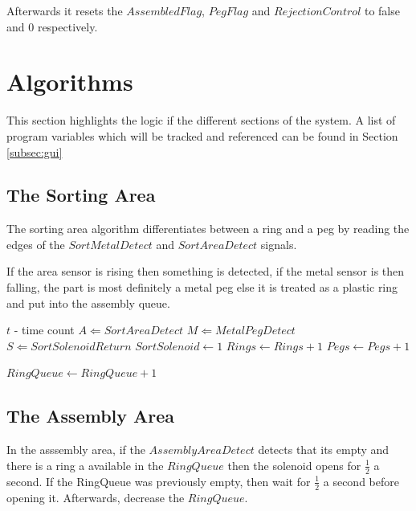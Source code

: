 \documentclass[12pt]{article}
\makeatletter
\newcommand*{\currentname}{\@currentlabelname}
\makeatother
\begin{document}
    Afterwards it resets the $AssembledFlag$, $PegFlag$ and $RejectionControl$ to false and 0
    respectively.


\section{Algorithms}
This section highlights the logic if the different sections of the system.
A list of program variables which will be tracked and referenced can be found in 
Section \ref{subsec:gui}

\subsection{The Sorting Area}
  The sorting area algorithm differentiates between a ring and a peg by reading the edges of the
  $SortMetalDetect$ and $SortAreaDetect$ signals.

  If the area sensor is rising then something is detected, if the metal sensor is then falling,
  the part is most definitely a metal peg else it is treated as a plastic ring and put into the
  assembly queue.

  \begin{algorithm}[H]
    \caption{\currentname}
    \begin{algorithmic}
      \REQUIRE $t$ - time count
      \STATE $A \Leftarrow SortAreaDetect$
      \STATE $M \Leftarrow MetalPegDetect$
      \STATE $S \Leftarrow SortSolenoidReturn$
          \STATE $SortSolenoid \leftarrow 1$
          \STATE $Rings \leftarrow Rings + 1$
          \ELSE
            \STATE $Pegs \leftarrow Pegs + 1$
          \ENDIF
        \ENDIF

          \STATE $RingQueue \leftarrow RingQueue + 1$
        \ENDIF
      \ENDWHILE
    \end{algorithmic}
  \end{algorithm}

\subsection{The Assembly Area}
  In the asssembly area, if the $AssemblyAreaDetect$ detects that its empty and there is a ring a available 
  in the $RingQueue$ then the solenoid opens for $\frac{1}{2}$ a second. If the RingQueue was previously
  empty, then wait for $\frac{1}{2}$ a second before opening it. Afterwards, decrease the $RingQueue$.
\end{document}
